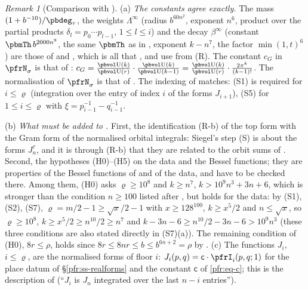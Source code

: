\documentclass[10pt]{amsart}
\theoremstyle{definition}
\theoremstyle{remark}
\newtheorem{remark}[theorem]{Remark}
\providecommand{\auU}{\mathrm U}
\begin{document}
\begin{remark}[Comparison with {\cite[Theorem~3.51]{P51}}]\label{pfr:rem-match}
(a) \emph{The constants agree exactly.} The mass $(1+b^{-10})/\pbdeg_\tau$, the weights
$\Lambda^\infty$ (radius $b^{60n^2}$, exponent $n^6$, product over the partial products
$\delta_l=p_0\cdots p_{l-1}$, $1\le l\le i$) and the decay $\beta^\infty$ (constant $\pbmTh\,b^{2000n^9}$,
the same $\pbmTh$ as in {\cite[\S3.3.4]{P51}}, exponent $k-n^7$, the factor $\min(1,t)^6$) are those of
{\cite[(38)]{P51}} and {\cite[Theorem~3.51\,(R)]{P51}}, which is all that {\cite[Theorem~3.50]{P51}},
{\cite[Lemma~3.52]{P51}} and {\cite[Theorem~3.53]{P51}} use from \textup{(R)}. The constant $c_G$ in
$\pfrN_\sigma$ is that of {\cite[\S3.3.4]{P51}}: $c_G=\frac{\pbvol\auU(k)}{\pbvol\auU(r)}\cdot
\frac{\pbvol\auU(k)}{\pbvol\auU(k-1)}=\frac{\pbvol\auU(k)}{\pbvol\auU(r)}\cdot\frac{2\pi^k}{(k-1)!}$. The
normalisation of $\pfrN_\sigma$ is that of {\cite[\S3.3.7]{P51}}. The indexing of
{\cite[Definition~3.44]{P51}} matches: (S1) is required for $i\le\varrho$ (integration over the entry of
index $i$ of the forms $J_{i+1}$), (S5) for $1\le i\le\varrho$ with $\xi=p_{i-1}^{-1}-q_{i-1}^{-1}$.

(b) \emph{What must be added to {\cite[Theorem~3.51\,(R)]{P51}}.} First, the identification (R-b) of the
top form with the Gram form of the normalised orbital integrals: Siegel's step \textup{(S)} is about
the forms $J_n^\tau$, and it is through (R-b) that they are related to the orbit sums of
{\cite[Proposition~3.42]{P51}}. Second, the hypotheses (H0)--(H5) on the data and the Bessel functions;
they are properties of the Bessel functions of {\cite[Theorem~3.22]{P51}} and of the data, and have to be
checked there. Among them, (H0) asks $\varrho\ge10^8$ and $k\ge n^7$, $k>10^9n^3+3n+6$, which is
stronger than the condition $n\ge100$ listed after {\cite[Theorem~3.53]{P51}}, but holds for the data: by
{\cite[Lemma~13.4]{P46}} (S1), (S2), (S7), $\varrho=m/2-1\ge\sqrt x/2-1$ with $x\ge128^{100}$, $k\ge x^5/2$ and
$n\le\sqrt x$, so $\varrho\ge10^8$, $k\ge x^5/2\ge n^{10}/2\ge n^7$ and $k-3n-6\ge n^{10}/2-3n-6>10^9n^3$ (these three conditions are also stated directly in (S7)(a)). The remaining condition of (H0), $8r\le\rho$, holds since $8r\le8nr\le b\le b^{6n+2}=\rho$ by {\cite[Lemma~13.4\,(S7)(b)]{P46}}.
(c) The functions $J_i$, $i\le\varrho$, are the normalised forms of floor $i$:
$J_i(p,q)=\mathsf c\cdot\pfrI_i(p,q;1)$ for the place datum of \S\ref{pfr:ss-realforms} and the constant
$\mathsf c$ of \eqref{pfr:eq-c}; this is the description of {\cite[\S3.3.7]{P51}} (``$J_i$ is $J_n$
integrated over the last $n-i$ entries'').
\end{remark}
\end{document}
